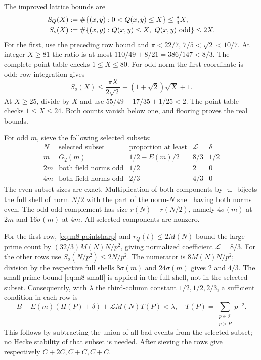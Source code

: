 The improved lattice bounds are
\begin{equation}
\begin{aligned}
 S_Q(X)&:=\#\{(x,y):0<Q(x,y)\le X\}\le\tfrac83 X,\\
 S_o(X)&:=\#\{(x,y):Q(x,y)\le X,\ Q(x,y)\ {\rm odd}\}\le2X.
                                                               \end{aligned}\label{eq:m8-pointsharp}
\end{equation}
For the first, use the preceding row bound and
\(\pi<22/7\), \(7/5<\sqrt2<10/7\).
At integer \(X\ge81\) the ratio is at most
\(110/49+8/21=386/147<8/3\).
The complete point table checks \(1\le X\le80\).
For odd norm the first coordinate is odd; row integration gives
\[
 S_o(X)\le\frac{\pi X}{2\sqrt2}+(1+\sqrt2)\sqrt X+1 .
\]
At \(X\ge25\), divide by \(X\) and use
\(55/49+17/35+1/25<2\).
The point table checks \(1\le X\le24\).
Both counts vanish below one, and flooring proves the real bounds.

For odd \(m\), sieve the following selected subsets:
\begin{equation}
\begin{array}{c|c|c|c|c}
 N&\text{selected subset}&\text{proportion at least}
                                      &\mathcal L&\delta\\ \hline
 m&G_2(m)&1/2-E(m)/2&8/3&1/2\\
 2m&\text{both field norms odd}&1/2&2&0\\
 4m&\text{both field norms odd}&2/3&4/3&0
\end{array}                                                    \label{eq:m8-selected}
\end{equation}
The even subset sizes are exact. Multiplication of both components
by \(\varpi\) bijects the full shell of norm \(N/2\) with the part
of the norm-\(N\) shell having both norms even.
The odd-odd complement has size \(r(N)-r(N/2)\), namely
\(4\sigma(m)\) at \(2m\) and \(16\sigma(m)\) at \(4m\).
All selected components are nonzero.

For the first row, \eqref{eq:m8-pointsharp} and
\(r_Q(t)\le2M(N)\) bound the large-prime count by
\((32/3)M(N)N/p^2\), giving normalized coefficient
\(\mathcal L=8/3\).
For the other rows use \(S_o(N/p^2)\le2N/p^2\).
The numerator is \(8M(N)N/p^2\); division by the respective
full shells \(8\sigma(m)\) and \(24\sigma(m)\) gives \(2\) and
\(4/3\). The small-prime bound \eqref{eq:m8-small} is applied
in the full shell, not in the selected subset.
Consequently, with \(\lambda\) the third-column constant
\(1/2,1/2,2/3\), a sufficient condition in each row is
\begin{equation}
       B+E(m)(\Pi(P)+\delta)+\mathcal L M(N)T(P)<\lambda,
       \quad T(P)=\sum_{\substack{p\in\mathcal I\\p>P}}p^{-2}.
                                                               \label{eq:m8-selectedtest}
\end{equation}
This follows by subtracting the union of all bad events from the
selected subset; no Hecke stability of that subset is needed.
After sieving the rows give respectively \(C+2C,C+C,C+C\).

